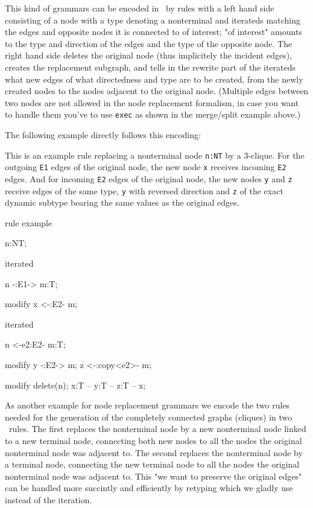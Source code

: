 This kind of grammars can be encoded in \GrG~by rules with a left hand side consisting of a node with a type denoting a nonterminal and iterateds matching the edges and opposite nodes it is connected to of interest; "of interest" amounts to the type and direction of the edges and the type of the opposite node. The right hand side deletes the original node (thus implicitely the incident edges), creates the replacement subgraph, and tells in the rewrite part of the iterateds what new edges of what directedness and type are to be created, from the newly created nodes to the nodes adjacent to the original node. (Multiple edges between two nodes are not allowed in the node replacement formalism, in case you want to handle them you've to use \texttt{exec} as shown in the merge/split example above.) 

The following example directly follows this encoding:

  \begin{example}
This is an example rule replacing a nonterminal node \texttt{n:NT} by a 3-clique.
For the outgoing \texttt{E1} edges of the original node, the new node \texttt{x} receives incoming \texttt{E2} edges.
And for incoming \texttt{E2} edges of the original node, the new nodes \texttt{y} and \texttt{z} receive edges of the same type, \texttt{y} with reversed direction and \texttt{z} of the exact dynamic subtype bearing the same values as the original edges.
    \begin{grgen}
rule example
{
  n:NT;

  iterated {
    n -:E1-> m:T;

    modify {
      x <-:E2- m;
    }
  }

  iterated {
    n <-e2:E2- m:T;   	

    modify {
      y -:E2-> m;
      z <-:copy<e2>- m;      
    }
  }
  
  modify {
    delete(n);
    x:T -- y:T -- z:T -- x; 
  }
}
    \end{grgen}
  \end{example}

As another example for node replacement grammars we encode the two rules needed for the generation of the completely connected graphs (cliques) in two \GrG~rules. The first replaces the nonterminal node by a new nonterminal node linked to a new terminal node, connecting both new nodes to all the nodes the original nonterminal node was adjacent to. The second replaces the nonterminal node by a terminal node, connecting the new terminal node to all the nodes the original nonterminal node was adjacent to. This "we want to preserve the original edges" can be handled more succintly and efficiently by retyping which we gladly use instead of the iteration.

